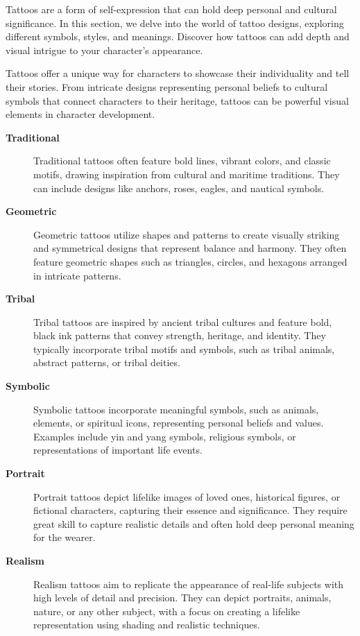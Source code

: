 \documentclass[12pt]{book}  %
\begin{document}
Tattoos are a form of self-expression that can hold deep personal and cultural significance. In this section, we delve into the world of tattoo designs, exploring different symbols, styles, and meanings. Discover how tattoos can add depth and visual intrigue to your character's appearance.

Tattoos offer a unique way for characters to showcase their individuality and tell their stories. From intricate designs representing personal beliefs to cultural symbols that connect characters to their heritage, tattoos can be powerful visual elements in character development.

\begin{description}
    \item[\textbf{Traditional}] Traditional tattoos often feature bold lines, vibrant colors, and classic motifs, drawing inspiration from cultural and maritime traditions. They can include designs like anchors, roses, eagles, and nautical symbols.
    \item[\textbf{Geometric}] Geometric tattoos utilize shapes and patterns to create visually striking and symmetrical designs that represent balance and harmony. They often feature geometric shapes such as triangles, circles, and hexagons arranged in intricate patterns.
    \item[\textbf{Tribal}] Tribal tattoos are inspired by ancient tribal cultures and feature bold, black ink patterns that convey strength, heritage, and identity. They typically incorporate tribal motifs and symbols, such as tribal animals, abstract patterns, or tribal deities.
    \item[\textbf{Symbolic}] Symbolic tattoos incorporate meaningful symbols, such as animals, elements, or spiritual icons, representing personal beliefs and values. Examples include yin and yang symbols, religious symbols, or representations of important life events.
    \item[\textbf{Portrait}] Portrait tattoos depict lifelike images of loved ones, historical figures, or fictional characters, capturing their essence and significance. They require great skill to capture realistic details and often hold deep personal meaning for the wearer.
    \item[\textbf{Realism}] Realism tattoos aim to replicate the appearance of real-life subjects with high levels of detail and precision. They can depict portraits, animals, nature, or any other subject, with a focus on creating a lifelike representation using shading and realistic techniques.
\end{description}
\end{document}
